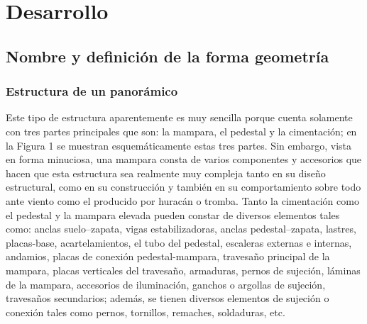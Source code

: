 \documentclass{article}
\begin{document}
\section{Desarrollo}
\subsection{Nombre y definición de la forma geometría}
\subsubsection{Estructura de un panorámico}
Este tipo de estructura aparentemente es muy sencilla porque cuenta solamente con tres partes principales que son: la mampara, el pedestal y la cimentación; en la Figura 1 se muestran esquemáticamente estas tres partes. Sin embargo, vista en forma minuciosa, una mampara consta de varios componentes y accesorios que hacen que esta estructura sea realmente muy compleja tanto en su diseño estructural, como en su construcción y también en su comportamiento sobre todo ante viento como el producido por huracán o tromba. Tanto la cimentación como el pedestal y la mampara elevada pueden constar de diversos elementos tales como: anclas suelo–zapata, vigas estabilizadoras, anclas pedestal–zapata, lastres, placas-base, acartelamientos, el tubo del pedestal, escaleras externas e internas, andamios, placas de conexión pedestal-mampara, travesaño principal de la mampara, placas verticales del travesaño, armaduras, pernos de sujeción, láminas de la mampara, accesorios de iluminación, ganchos o argollas de sujeción, travesaños secundarios; además, se tienen diversos elementos de sujeción o conexión tales como pernos, tornillos, remaches, soldaduras, etc\cite{rf2}.
\end{document}
